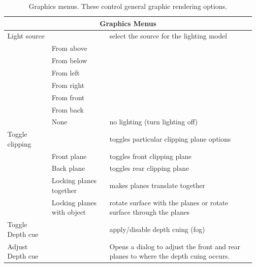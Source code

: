 \begin{table}[ht]
\caption{Graphics menus.  These control general graphic rendering options.}
  \begin{center}
    \begin{tabular}{|l|l|p{3 in}|} \hline
      \multicolumn{3}{|c|}{\textbf{Graphics Menus}} \\ \hline
    Light source & & select the source for the lighting model\\
    & From above &  \\
    & From below &  \\
    & From left &  \\
    & From right &  \\
    & From front &  \\
    & From back &  \\
    & None & no lighting (turn lighting off) \\ \hline
    Toggle clipping & & toggles particular clipping plane options \\
    & Front plane & toggles front clipping plane \\
    & Back plane & toggles rear clipping plane \\
    & Locking planes together & makes planes translate together\\
    & Locking planes with object & rotate surface with the planes or
        rotate surface through the planes \\
    Toggle Depth cue & & apply/disable depth cuing (fog) \\
    Adjust Depth cue & & Opens a dialog to adjust the front and rear planes
    to where the depth cuing occurs. \\
    \hline
    \end{tabular}
  \end{center}
\end{table}

